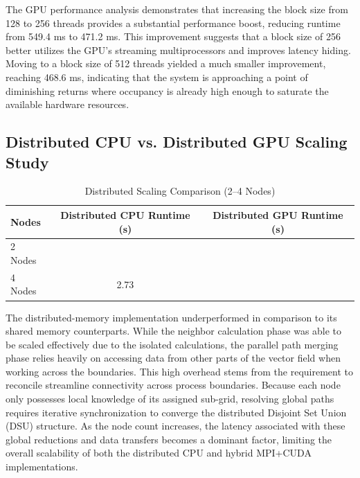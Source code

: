 The GPU performance analysis demonstrates that increasing the block size from 128 to 256 threads provides a substantial performance boost, reducing runtime from 549.4 ms to 471.2 ms.
This improvement suggests that a block size of 256 better utilizes the GPU's streaming multiprocessors and improves latency hiding.
Moving to a block size of 512 threads yielded a much smaller improvement, reaching 468.6 ms, indicating that the system is approaching a point of diminishing returns where occupancy is already high enough to saturate the available hardware resources.


\subsection{Distributed CPU vs. Distributed GPU Scaling Study}

\begin{table}[htbp]
	\centering
	\caption{Distributed Scaling Comparison (2--4 Nodes)}
	\label{tab:distributed_scaling}
	\begin{tabular}{|l|c|c|}
		\hline
		\textbf{Nodes} & \textbf{Distributed CPU Runtime (s)} & \textbf{Distributed GPU Runtime (s)} \\ \hline
		2 Nodes        &                                      &                                      \\ \hline
		4 Nodes        & 2.73                                 &                                      \\ \hline
	\end{tabular}
\end{table}

The distributed-memory implementation underperformed in comparison to its shared memory counterparts.
While the neighbor calculation phase was able to be scaled effectively due to the isolated calculations, the parallel path merging phase relies heavily on accessing data from other parts of the vector field when working across the boundaries.
This high overhead stems from the requirement to reconcile streamline connectivity across process boundaries.
Because each node only possesses local knowledge of its assigned sub-grid, resolving global paths requires iterative synchronization to converge the distributed Disjoint Set Union (DSU) structure.
As the node count increases, the latency associated with these global reductions and data transfers becomes a dominant factor, limiting the overall scalability of both the distributed CPU and hybrid MPI+CUDA implementations.

